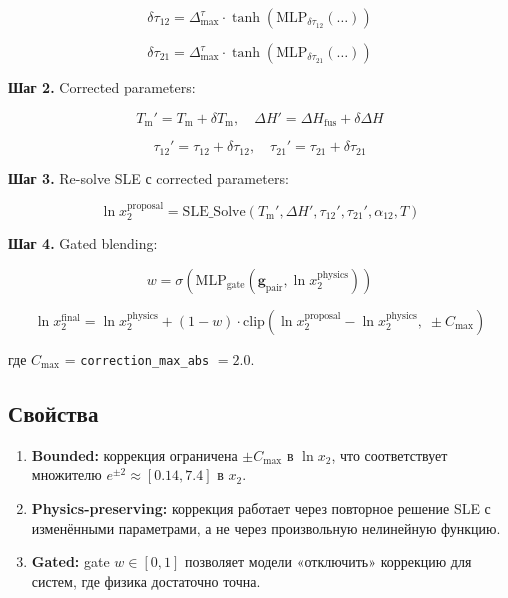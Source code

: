 \documentclass[11pt]{article}
\begin{document}
\begin{equation*}
\delta\tau_{12} = \Delta_{\max}^{\tau} \cdot \tanh\!\left(\mathrm{MLP}_{\delta\tau_{12}}(\ldots)\right)
\end{equation*}

\begin{equation*}
\delta\tau_{21} = \Delta_{\max}^{\tau} \cdot \tanh\!\left(\mathrm{MLP}_{\delta\tau_{21}}(\ldots)\right)
\end{equation*}

\textbf{Шаг 2.} Corrected parameters:

\begin{equation*}
T_{\mathrm{m}}' = T_{\mathrm{m}} + \delta T_{\mathrm{m}}, \quad \Delta H' = \Delta H_{\mathrm{fus}} + \delta\Delta H
\end{equation*}

\begin{equation*}
\tau_{12}' = \tau_{12} + \delta\tau_{12}, \quad \tau_{21}' = \tau_{21} + \delta\tau_{21}
\end{equation*}

\textbf{Шаг 3.} Re-solve SLE с corrected parameters:

\begin{equation*}
\ln x_2^{\mathrm{proposal}} = \mathrm{SLE\_Solve}(T_{\mathrm{m}}', \Delta H', \tau_{12}', \tau_{21}', \alpha_{12}, T)
\end{equation*}

\textbf{Шаг 4.} Gated blending:

\begin{equation*}
w = \sigma\!\left(\mathrm{MLP}_{\mathrm{gate}}(\mathbf{g}_{\mathrm{pair}}, \ln x_2^{\mathrm{physics}})\right)
\end{equation*}

\begin{equation*}
\ln x_2^{\mathrm{final}} = \ln x_2^{\mathrm{physics}} + (1 - w) \cdot \mathrm{clip}\!\left(\ln x_2^{\mathrm{proposal}} - \ln x_2^{\mathrm{physics}},\; \pm C_{\max}\right)
\end{equation*}

где $C_{\max}$ = \texttt{correction\_max\_abs} $= 2.0$.

\subsection{Свойства}

\begin{enumerate}
  \item \textbf{Bounded:} коррекция ограничена $\pm C_{\max}$ в $\ln x_2$, что соответствует множителю $e^{\pm 2} \approx [0.14, 7.4]$ в $x_2$.
  \item \textbf{Physics-preserving:} коррекция работает через повторное решение SLE с изменёнными параметрами, а не через произвольную нелинейную функцию.
  \item \textbf{Gated:} gate $w \in [0, 1]$ позволяет модели «отключить» коррекцию для систем, где физика достаточно точна.
\end{enumerate}
\end{document}
